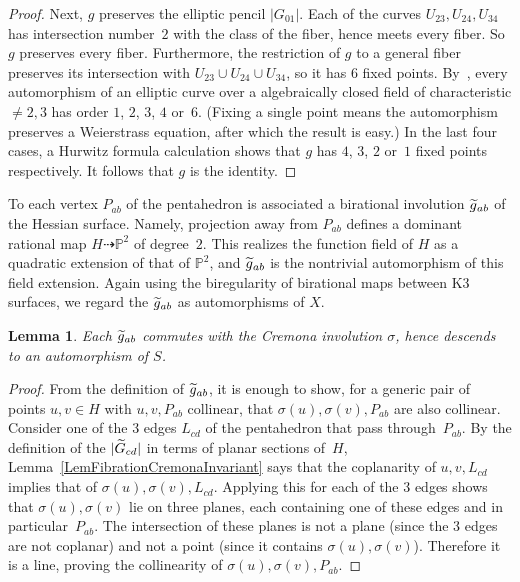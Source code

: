 \documentclass[11pt]{article}
\newtheorem{lemm}[theo]{Lemma}
\theoremstyle{definition}
\numberwithin{equation}{section}
\numberwithin{figure}{section}
\numberwithin{table}{section}
\let\oldtilde\tilde
\renewcommand*\tilde[1]{\mathchoice{\widetilde{#1}}{\widetilde{#1}}{\oldtilde{#1}}{\oldtilde{#1}}}
\newcommand*\gtilde{\tilde g}
\newcommand*\Gtilde{\tilde G}
\newcommand{\bbP}{{\mathbb{P}}}
\begin{document}
\begin{proof}
Next, $g$ preserves the elliptic pencil $|G_{01}|$. Each of the curves $U_{23},U_{24},U_{34}$ has intersection number~$2$ with the class of the fiber, hence meets every fiber. So $g$ preserves every fiber. Furthermore, the restriction of $g$ to a general fiber preserves its intersection with $U_{23}\cup U_{24}\cup U_{34}$, so it has 6 fixed points. By~\cite[Theorem~III.10.1]{Silverman}, every automorphism of an elliptic curve over a algebraically closed field of characteristic${}\ne 2,3$ has order $1$, $2$, $3$, $4$ or~$6$. (Fixing a single point means the automorphism preserves a Weierstrass equation, after which the result is easy.) In the last four cases, a Hurwitz formula calculation shows that $g$ has $4$, $3$, $2$ or~$1$ fixed points respectively. It follows that $g$ is the identity.
\end{proof}

To each vertex $P_{ab}$ of the pentahedron is associated a birational involution $\gtilde_{ab}$ of the Hessian surface. Namely, projection away from $P_{ab}$ defines a dominant rational map $H\dasharrow\bbP^2$ of degree~$2$. This realizes the function field of $H$ as a quadratic extension of that of $\bbP^2$, and $\gtilde_{ab}$ is the nontrivial automorphism of this field extension. Again using the biregularity of birational maps between K3 surfaces, we regard the $\gtilde_{ab}$ as automorphisms of $X$.

\begin{lemm}
Each $\gtilde_{ab}$ commutes with the Cremona involution $\sigma$, hence descends to an automorphism of $S$.
\end{lemm}

\begin{proof}
From the definition of $\gtilde_{ab}$, it is enough to show, for a generic pair of points $u,v\in H$ with $u,v,P_{ab}$ collinear, that $\sigma(u),\sigma(v),P_{ab}$ are also collinear. Consider one of the 3 edges $L_{cd}$ of the pentahedron that pass through~$P_{ab}$. By the definition of the $|\Gtilde_{cd}|$ in terms of planar sections of~$H$, Lemma~\ref{LemFibrationCremonaInvariant} says that the coplanarity of $u,v,L_{cd}$ implies that of $\sigma(u),\sigma(v),L_{cd}$. Applying this for each of the 3 edges shows that $\sigma(u),\sigma(v)$ lie on three planes, each containing one of these edges and in particular~$P_{ab}$. The intersection of these planes is not a plane (since the 3 edges are not coplanar) and not a point (since it contains $\sigma(u),\sigma(v)$). Therefore it is a line, proving the collinearity of $\sigma(u),\sigma(v),P_{ab}$.
\end{proof}
\end{document}
